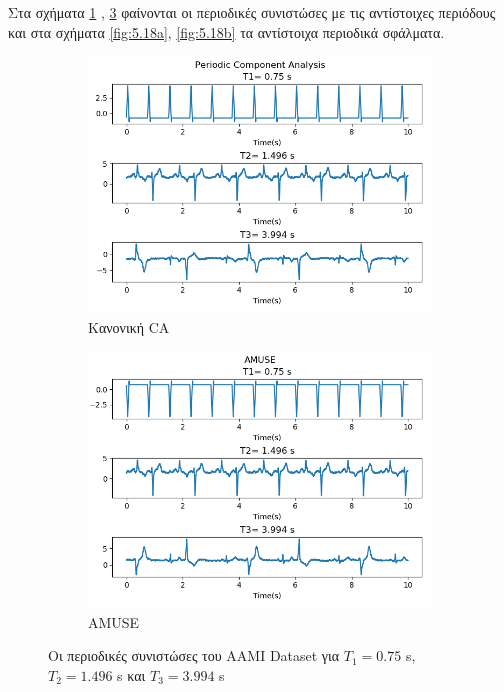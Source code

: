 \noindent Στα σχήματα \en \ref{fig:5.17a} , \ref{fig:5.17b} \gr
φαίνονται οι περιοδικές συνιστώσες με τις αντίστοιχες περιόδους και στα σχήματα \en \ref{fig:5.18a}, \ref{fig:5.18b} \gr
τα αντίστοιχα περιοδικά σφάλματα.
\begin{figure}[H]
    \centering
    \begin{subfigure}{0.48 \textwidth}
        \centering
       \includegraphics[width=\textwidth]{biosignals/aami_pica.png}\en
        \caption{\gr Κανονική \en \pi CA} \gr
        \label{fig:5.17a}
    \end{subfigure}
    \hfill
    \begin{subfigure}{0.48 \textwidth}
        \centering
       \includegraphics[width=\textwidth]{biosignals/aami_amuse.png}
        \en
        \caption{AMUSE} \gr
        \label{fig:5.17b}
    \end{subfigure}
    \gr
    \caption{Οι περιοδικές συνιστώσες του \en AAMI Dataset \gr για \en $T_1 = 0.75$ s, $T_2 = 1.496$ s \gr και \en $T_3 = 3.994$ s \gr }
\end{figure}
